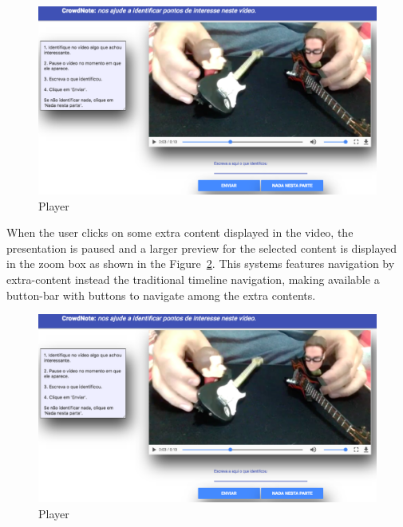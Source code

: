 \begin{figure}[h!]
	\centerline{\includegraphics[scale=0.22] {figure/task_1}}
	\caption{Player}
	\label{player}
\end{figure}

When the user clicks on some extra content displayed in the video, the presentation is paused and a larger preview for the selected content is displayed in the zoom box as shown in the Figure~\ref{zoom}. This systems features navigation by extra-content instead the traditional timeline navigation, making available a button-bar with buttons to navigate among the extra contents.
 
\begin{figure}[h!]
	\centerline{\includegraphics[scale=0.22] {figure/task_1}}
	\caption{Player}
	\label{zoom}
\end{figure}
